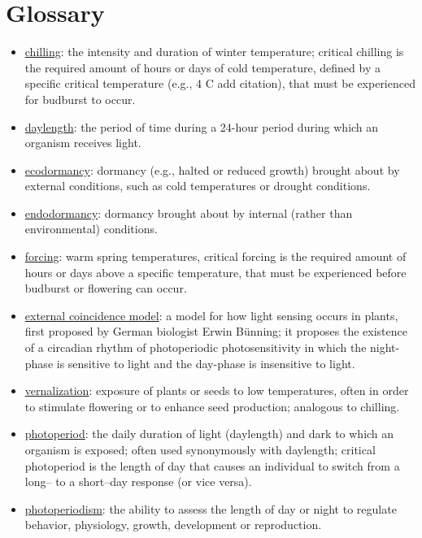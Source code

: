 \documentclass{article}
\begin{document}
\section* {Glossary}
\begin{itemize}
\item \underline{chilling}: the intensity and duration of winter temperature; critical chilling is the required amount of hours or days of cold temperature, defined by a specific critical temperature (e.g., 4 \degree C add citation), that must be experienced for budburst to occur.
\item \underline{daylength}: the period of time during a 24-hour period during which an organism receives light.
\item \underline{ecodormancy}: dormancy (e.g., halted or reduced growth) brought about by external conditions, such as cold temperatures or drought conditions. 
\item \underline{endodormancy}: dormancy brought about by internal (rather than environmental) conditions. 
\item \underline{forcing}: warm spring temperatures, critical forcing is the required amount of hours or days above a specific temperature, that must be experienced before budburst or flowering can occur.
\item \underline{external coincidence model}: a model for how light sensing occurs in plants, first proposed by German biologist Erwin Bünning; it proposes the existence of a circadian rhythm of photoperiodic photosensitivity in which the night-phase is sensitive to light and the day-phase is insensitive to light. 
\item \underline{vernalization}: exposure of plants or seeds to low temperatures, often in order to stimulate flowering or to enhance seed production; analogous to chilling.
\item \underline{photoperiod}: the daily duration of light (daylength) and dark to which an organism is exposed; often used synonymously with daylength; critical photoperiod is the length of day that causes an individual to switch from a long-- to a short--day response (or vice versa).
\item \underline{photoperiodism}: the ability to assess the length of day or night to regulate behavior, physiology, growth, development or reproduction.
\end{itemize}
\end{document}
